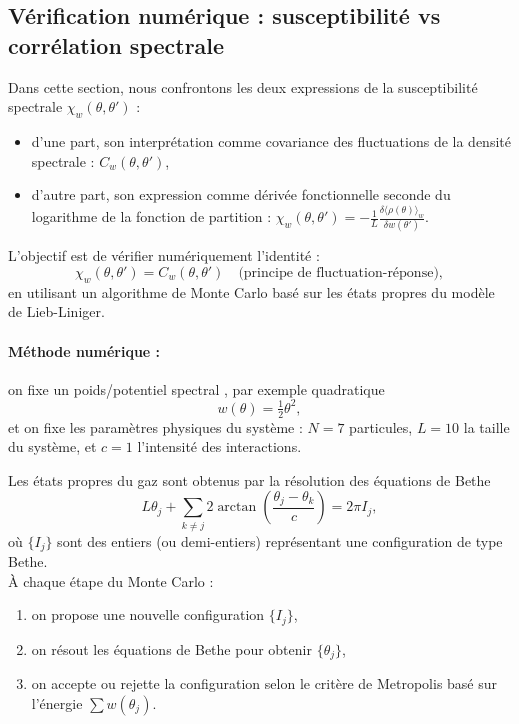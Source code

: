 \subsection{Vérification numérique : susceptibilité vs corrélation spectrale}

Dans cette section, nous confrontons les deux expressions de la susceptibilité spectrale \( \chi_w(\theta, \theta') \) :
\begin{itemize}[label = $\bullet$]
    \item d'une part, son interprétation comme covariance des fluctuations de la densité spectrale : \( C_w(\theta, \theta') \),
    \item d'autre part, son expression comme dérivée fonctionnelle seconde du logarithme de la fonction de partition : \( \chi_w(\theta, \theta') = - \frac{1}{L} \frac{\delta \langle \rho(\theta) \rangle_w}{\delta w(\theta')} \).
\end{itemize}

L'objectif est de vérifier numériquement l'identité :
\[
\chi_w(\theta, \theta') = C_w(\theta, \theta') \quad \text{(principe de fluctuation-réponse)},
\]
en utilisant un algorithme de Monte Carlo basé sur les états propres du modèle de Lieb-Liniger.

\paragraph{Méthode numérique :} on fixe un poids/potentiel spectral , par exemple quadratique
\[
w(\theta) = \tfrac{1}{2} \theta^2,
\]
et on fixe les paramètres physiques du système : \( N = 7 \) particules, \( L = 10 \) la taille du système, et \( c = 1 \) l’intensité des interactions.

Les états propres du gaz sont obtenus par la résolution des équations de Bethe
\[
L \theta_j + \sum_{k \ne j} 2 \arctan \left( \frac{\theta_j - \theta_k}{c} \right) = 2 \pi I_j,
\]
où \( \{I_j\} \) sont des entiers (ou demi-entiers) représentant une configuration de type Bethe.\\

À chaque étape du Monte Carlo :
\begin{enumerate}
    \item on propose une nouvelle configuration \( \{I_j\} \),
    \item on résout les équations de Bethe pour obtenir \( \{ \theta_j \} \),
    \item on accepte ou rejette la configuration selon le critère de Metropolis basé sur l’énergie \( \sum w(\theta_j) \).
\end{enumerate}

